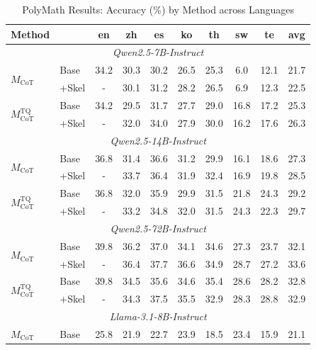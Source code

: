 \begin{table}[t]
\centering
\footnotesize
\setlength{\tabcolsep}{3pt}
\renewcommand{\arraystretch}{1.15}

\caption{PolyMath Results: Accuracy (\%) by Method across Languages}
\label{tab:polymath-method-language}

\begin{tabular}{llcccccccc}
\toprule
\textbf{Method} & & \textbf{en} & \textbf{zh} & \textbf{es} & \textbf{ko} & \textbf{th} & \textbf{sw} & \textbf{te} & \textbf{avg} \\
\midrule
\multicolumn{10}{c}{\textit{Qwen2.5-7B-Instruct}} \\
\multirow{2}{*}{$M_{\text{CoT}}$} & Base & 34.2 & 30.3 & 30.2 & 26.5 & 25.3 & 6.0 & 12.1 & 21.7 \\
& +Skel & - & 30.1 & 31.2 & 28.2 & 26.5 & 6.9 & 12.3 & 22.5 \\
\multirow{2}{*}{$M_{\text{CoT}}^{\text{TQ}}$} & Base & 34.2 & 29.5 & 31.7 & 27.7 & 29.0 & 16.8 & 17.2 & 25.3 \\
& +Skel & - & 32.0 & 34.0 & 27.9 & 30.0 & 16.2 & 17.6 & 26.3 \\
\midrule
\multicolumn{10}{c}{\textit{Qwen2.5-14B-Instruct}} \\
\multirow{2}{*}{$M_{\text{CoT}}$} & Base & 36.8 & 31.4 & 36.6 & 31.2 & 29.9 & 16.1 & 18.6 & 27.3 \\
& +Skel & - & 33.7 & 36.4 & 31.9 & 32.4 & 16.9 & 19.8 & 28.5 \\
\multirow{2}{*}{$M_{\text{CoT}}^{\text{TQ}}$} & Base & 36.8 & 32.0 & 35.9 & 29.9 & 31.5 & 21.8 & 24.3 & 29.2 \\
& +Skel & - & 33.2 & 34.8 & 32.0 & 31.5 & 24.3 & 22.3 & 29.7 \\
\midrule
\multicolumn{10}{c}{\textit{Qwen2.5-72B-Instruct}} \\
\multirow{2}{*}{$M_{\text{CoT}}$} & Base & 39.8 & 36.2 & 37.0 & 34.1 & 34.6 & 27.3 & 23.7 & 32.1 \\
& +Skel & - & 36.4 & 37.7 & 36.6 & 34.9 & 28.7 & 27.2 & 33.6 \\
\multirow{2}{*}{$M_{\text{CoT}}^{\text{TQ}}$} & Base & 39.8 & 34.5 & 35.6 & 34.6 & 35.4 & 28.6 & 28.2 & 32.8 \\
& +Skel & - & 34.3 & 37.5 & 35.5 & 32.9 & 28.3 & 28.8 & 32.9 \\
\midrule
\multicolumn{10}{c}{\textit{Llama-3.1-8B-Instruct}} \\
\multirow{2}{*}{$M_{\text{CoT}}$} & Base & 25.8 & 21.9 & 22.7 & 23.9 & 18.5 & 23.4 & 15.9 & 21.1 \\

\end{tabular}
\end{table}

